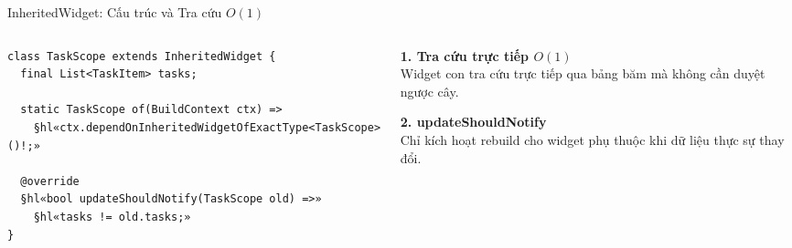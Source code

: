 \documentclass[aspectratio=169, 11pt]{beamer}
\begin{document}
\begin{frame}[fragile]{InheritedWidget: Cấu trúc và Tra cứu $O(1)$}
  \vspace{-0.10cm}
  \begin{columns}[c, onlytextwidth]
    \begin{column}{0.57\textwidth}
      \begin{codepanel}[top=7pt, bottom=7pt]
\begin{Verbatim}[commandchars=§«»,fontsize=\fontsize{7.0pt}{10.0pt}\selectfont]
class TaskScope extends InheritedWidget {
  final List<TaskItem> tasks;

  static TaskScope of(BuildContext ctx) =>
    §hl«ctx.dependOnInheritedWidgetOfExactType<TaskScope>()!;»

  @override
  §hl«bool updateShouldNotify(TaskScope old) =>»
    §hl«tasks != old.tasks;»
}
\end{Verbatim}
      \end{codepanel}
    \end{column}
    \hfill
    \begin{column}{0.40\textwidth}
      \begin{codepanel}[top=8pt, bottom=8pt]
        {\small\bfseries\color{DarkMain} 1. Tra cứu trực tiếp $O(1)$}\\[3pt]
        {\footnotesize Widget con tra cứu trực tiếp qua bảng băm mà không cần duyệt ngược cây.}
      \end{codepanel}

      \vspace{0.20cm}
      \begin{codepanel}[top=8pt, bottom=8pt]
        {\small\bfseries\color{DarkMain} 2. updateShouldNotify}\\[3pt]
        {\footnotesize Chỉ kích hoạt rebuild cho widget phụ thuộc khi dữ liệu thực sự thay đổi.}
      \end{codepanel}
    \end{column}
  \end{columns}
\end{frame}
\end{document}
